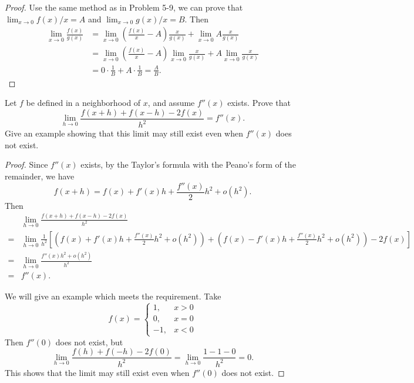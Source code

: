 \documentclass{article}
\begin{document}
\begin{proof}
  Use the same method as in Problem 5-9, we can prove that \( \lim_{x\to 0}f(x)/x=A \) and \( \lim_{x\to 0}g(x)/x=B \). Then
  \begin{align*}
    \lim_{x\to 0}\frac{f(x)}{g(x)}
    &=\lim_{x\to 0}\left(\frac{f(x)}{x}-A\right)\frac{x}{g(x)}+\lim_{x\to 0}A\frac{x}{g(x)}\\
    &=\lim_{x\to 0}\left(\frac{f(x)}{x}-A\right)\lim_{x\to 0}\frac{x}{g(x)}+A\lim_{x\to 0}\frac{x}{g(x)}\\
    &=0\cdot\frac{1}{B}+A\cdot\frac{1}{B}=\frac{A}{B}.
  \end{align*}
\end{proof}



\begin{problem}[5-11]
Let $f$ be defined in a neighborhood of $x$, and assume $f''(x)$ exists. Prove that
\[
\lim_{h\to 0}\frac{f(x+h)+f(x-h)-2f(x)}{h^2}=f''(x).
\]
Give an example showing that this limit may still exist even when $f''(x)$ does not exist.
\end{problem}

\begin{proof}
  Since \( f''(x) \) exists, by the Taylor's formula with the Peano's form of the remainder, we have
  \[ f(x+h)=f(x)+f'(x)h+\frac{f''(x)}{2}h^2+o(h^2). \]
  Then
  \begin{align*}
    &\lim_{h\to 0}\frac{f(x+h)+f(x-h)-2f(x)}{h^2}\\
    =&\lim_{h\to 0}\frac{1}{h^2}\left[ \left( f(x)+f'(x)h+\frac{f''(x)}{2}h^2+o(h^2) \right)+\left( f(x)-f'(x)h+\frac{f''(x)}{2}h^2+o(h^2) \right)-2f(x) \right]\\
    =&\lim_{h\to 0}\frac{f''(x)h^2+o(h^2)}{h^2}\\
    =&f''(x).
  \end{align*}\par
  We will give an example which meets the requirement. Take
  \[ f(x)=\begin{cases}
    1,&x>0\\
    0,&x=0\\
    -1,&x<0
  \end{cases} \]
  Then \( f''(0) \) does not exist, but
  \[ \lim_{h\to 0}\frac{f(h)+f(-h)-2f(0)}{h^2} = \lim_{h\to 0}\frac{1-1-0}{h^2} = 0. \]
  This shows that the limit may still exist even when \( f''(0) \) does not exist.
\end{proof}
\end{document}
